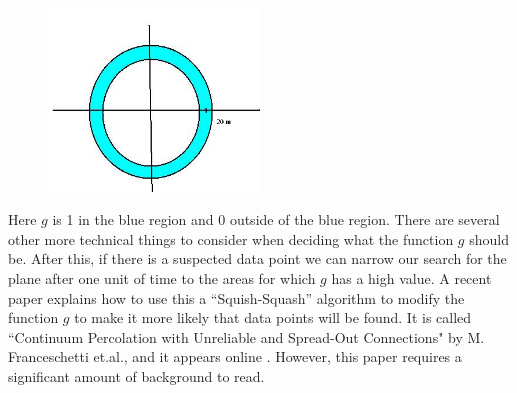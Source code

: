 	\begin{figure}[H]
	   \centering
	   \includegraphics[width=0.5\textwidth]{season1/112/images/squish.jpg} 
	\end{figure}

Here $g$ is 1 in the blue region and 0 outside of the blue region. There are several other more technical things to consider when deciding what the function $g$ should be. After this, if there is a suspected data point we can narrow our search for the plane after one unit of time to the areas for which $g$ has a high value. A recent paper explains how to use this a ``Squish-Squash'' algorithm to modify the function $g$ to make it more likely that data points will be found. It is called ``Continuum Percolation with Unreliable and Spread-Out Connections" by M. Franceschetti et.al., and it appears online . However, this paper requires a significant amount of background to read.

